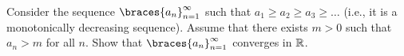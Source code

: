 \begin{problem}
  Consider the sequence $\braces{a_n}_{n=1}^\infty$
  such that $a_1 \geq a_2 \geq a_3 \geq \dots$
  (i.e., it is a monotonically decreasing sequence).
  Assume that there exists $m > 0$ such that
  $a_n > m$ for all $n$.
  Show that $\braces{a_n}_{n=1}^\infty$ converges in $\mathbb{R}$.
\end{problem}

\begin{answer}
  
\end{answer}
